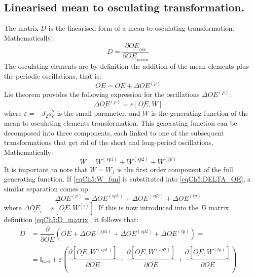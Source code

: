 	\subsection{Linearised mean to osculating transformation.}
	\indent The matrix $D$ is the linearised form of a mean to osculating transformation. Mathematically:
	\begin{equation}
	D = \dfrac{\partial \underline{OE}_{osc}}{\partial \underline{OE}_{mean}}
	\label{eqCh5:D_matrix}
	\end{equation}
	\indent The osculating elements are by definition the addition of the mean elements plus the periodic oscillations, that is:
	\begin{equation}
	\underline{OE} = \overline{\underline{OE}} + \Delta \underline{OE}^{(p)}
	\end{equation}
	\indent Lie theorem provides the following expression for the oscillations $\Delta \underline{OE}^{(p)}$:
	\begin{equation}
	\Delta \underline{OE}^{(p)}  = \varepsilon [\underline{OE}, W]
	\label{eqCh5:DELTA_OE}
	\end{equation}
	\noindent where $\varepsilon = -J_2 a_e^2$ is the small parameter, and $W$ is the generating function of the mean to osculating elements transformation. This generating function can be decomposed into three components, each linked to one of the subsequent transformations that get rid of the short and long-period oscillations. Mathematically:
	\begin{equation}
	W = W^{(sp1)} + W^{(sp2)} + W^{(lp)}
	\label{eqCh5:W_fun}
	\end{equation}
	\indent It is important to note that $W = W_1$ is the first order component of the full generating function. If \eqref{eqCh5:W_fun} is substituted into \eqref{eqCh5:DELTA_OE}, a similar separation comes up:
	\begin{equation}
	\Delta \underline{OE}^{(p)} = \Delta \underline{OE}^{(sp1)} + \Delta \underline{OE}^{(sp2)} + \Delta \underline{OE}^{(lp)}
	\end{equation}
	\noindent where $\Delta \underline{OE}_{i} = \varepsilon [\underline{OE}, W^{(i)}]$. If this is now introduced into the $D$ matrix definition \eqref{eqCh5:D_matrix}, it follows that:
	\[
	\begin{array}{lll}
	D 	& = \dfrac{\partial }{\partial \overline{\underline{OE}}}\left( \overline{\underline{OE} } + \Delta \underline{OE}^{(sp1)} + \Delta \underline{OE}^{(sp2)} + \Delta \underline{OE}^{(lp)}\right) = \\
		& = \mathbb{I}_{6x6} + \varepsilon \left( \dfrac{\partial [\underline{OE}, W^{(sp1)}] }{\partial \underline{\overline{OE}}} + \dfrac{\partial [\underline{OE}, W^{(sp2)}] }{\partial \underline{\overline{OE}}} + \dfrac{\partial [\underline{OE}, W^{(lp)}] }{\partial \underline{\overline{OE}}}\right)
	\end{array}
	\]
